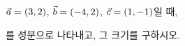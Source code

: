 $\vec{a}=(3{,}\mkern3mu\mathopen{}2)$, $\vec{b}=(-4{,}\mkern3mu\mathopen{}2)$, $\vec{c}=(1{,}\mkern3mu\mathopen{}-1)$일 때, \par\smallskip{}\par\smallskip\noindent 를 성분으로 나타내고, 그 크기를 구하시오.
